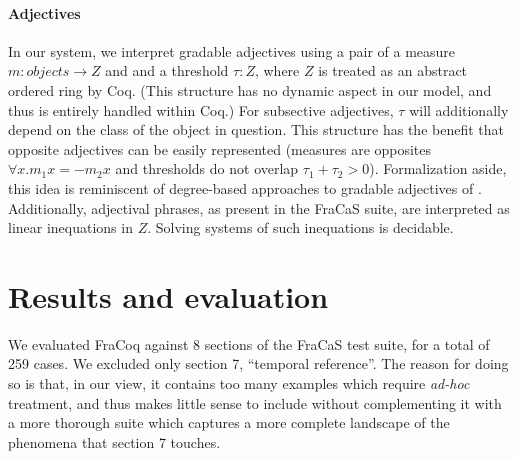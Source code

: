 \documentclass[11pt]{article}
\begin{document}
\paragraph{Adjectives}
In our system, we interpret gradable adjectives using a pair of a
measure $m : objects → Z$ and and a threshold $τ : Z$, where $Z$ is
treated as an abstract ordered ring by Coq. (This structure has no
dynamic aspect in our model, and thus is entirely handled within Coq.)
For subsective adjectives, $τ$ will additionally depend on the class
of the object in question. This structure has the benefit that
opposite adjectives can be easily represented (measures are opposites
$∀x. m_1 x = -m_2 x$ and thresholds do not overlap $τ_1 + τ_2 >
0$). Formalization aside, this idea is reminiscent of degree-based
approaches to gradable adjectives of
\citet{Cresswell:1976,Kennedy:2007}.  Additionally,
adjectival phrases, as present in the FraCaS suite, are interpreted as
linear inequations in $Z$. Solving systems of such inequations is
decidable.




\section{Results and evaluation}

We evaluated FraCoq against 8 sections of the FraCaS test suite, for a
total of 259 cases. We excluded only section 7, ``temporal reference''. The reason for
doing so is that, in our view, it contains too many examples which
require \textit{ad-hoc} treatment, and thus makes little sense to
include without complementing it with a more thorough suite which
captures a more complete landscape of the phenomena that section 7
touches.
\end{document}
